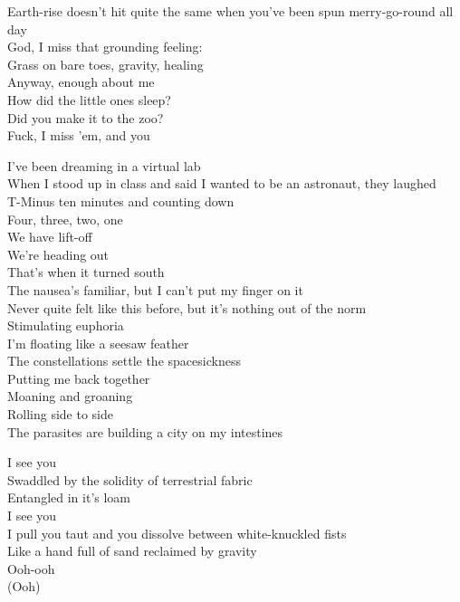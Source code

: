 Earth-rise doesn't hit quite the same when you've been spun merry-go-round all day \\
God, I miss that grounding feeling: \\
Grass on bare toes, gravity, healing \\
Anyway, enough about me \\
How did the little ones sleep? \\
Did you make it to the zoo? \\
Fuck, I miss 'em, and you \\


I've been dreaming in a virtual lab \\
When I stood up in class and said I wanted to be an astronaut, they laughed \\
T-Minus ten minutes and counting down \\
Four, three, two, one \\
We have lift-off \\
We're heading out \\
That's when it turned south \\

The nausea's familiar, but I can't put my finger on it \\
Never quite felt like this before, but it's nothing out of the norm \\
Stimulating euphoria \\
I'm floating like a seesaw feather \\
The constellations settle the spacesickness \\
Putting me back together \\

Moaning and groaning \\
Rolling side to side \\
The parasites are building a city on my intestines \\


I see you \\
Swaddled by the solidity of terrestrial fabric \\
Entangled in it's loam \\
I see you \\
I pull you taut and you dissolve between white-knuckled fists \\
Like a hand full of sand reclaimed by gravity \\
Ooh-ooh \\
(Ooh) \\


